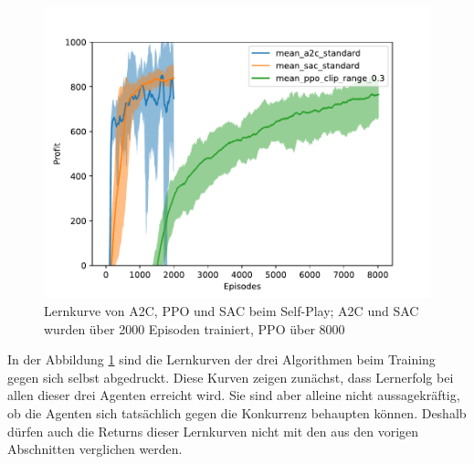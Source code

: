 \begin{figure}[htbp]
	\centering
	\includegraphics[width=\textwidth]{main/self_play.pdf}
	\caption{Lernkurve von A2C, PPO und SAC beim Self-Play; A2C und SAC wurden über 2000 Episoden trainiert, PPO über 8000}
	\label{grafic:SelfPlayLearningCurve}
\end{figure}
In der Abbildung \ref{grafic:SelfPlayLearningCurve} sind die Lernkurven der drei Algorithmen beim Training gegen sich selbst abgedruckt.
Diese Kurven zeigen zunächst, dass Lernerfolg bei allen dieser drei Agenten erreicht wird.
Sie sind aber alleine nicht aussagekräftig, ob die Agenten sich tatsächlich gegen die Konkurrenz behaupten können.
Deshalb dürfen auch die Returns dieser Lernkurven nicht mit den aus den vorigen Abschnitten verglichen werden.

